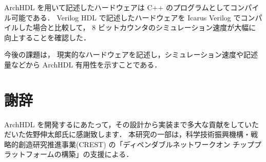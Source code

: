 \documentclass[submit,techreq,noauthor]{ipsj}
\begin{document}
ArchHDL を用いて記述したハードウェアは C++ のプログラムとしてコンパイル可能である．
Verilog HDL で記述したハードウェアを Icarus Verilog でコンパイルした場合と比較して，
8 ビットカウンタのシミュレーション速度が大幅に向上することを確認した．

今後の課題は，
現実的なハードウェアを記述し，シミュレーション速度や記述量などから ArchHDL 有用性を示すことである．

\section*{謝辞}
ArchHDL を開発するにあたって，その設計から実装まで多大な貢献をしていただいた佐野伸太郎氏に感謝致します．
本研究の一部は，科学技術振興機構・戦略的創造研究推進事業(CREST) の「ディペンダブルネットワークオン
チッププラットフォームの構築」の支援による．



\end{document}
